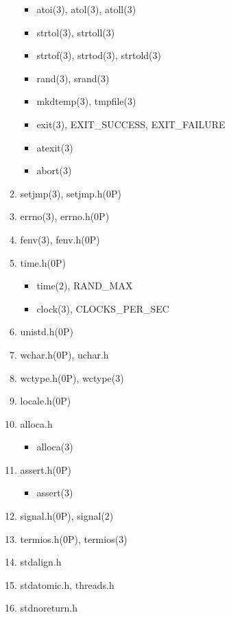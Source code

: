 \documentclass{article}
\begin{document}
\begin{enumerate}
\begin{enumerate}
\begin{itemize}
                    \item atoi(3), atol(3), atoll(3)
                    \item strtol(3), strtoll(3)
                    \item strtof(3), strtod(3), strtold(3)
                    \item rand(3), srand(3)
                    \item mkdtemp(3), tmpfile(3)
                    \item exit(3), EXIT_SUCCESS, EXIT_FAILURE
                    \item atexit(3)
                    \item abort(3)
                \end{itemize}
            \item setjmp(3), setjmp.h(0P)
            \item errno(3), errno.h(0P)
            \item fenv(3), fenv.h(0P)
            \item time.h(0P)
                \begin{itemize}
                    \item time(2), RAND_MAX
                    \item clock(3), CLOCKS_PER_SEC
                \end{itemize}
            \item unistd.h(0P)
            \item wchar.h(0P), uchar.h
            \item wctype.h(0P), wctype(3)
            \item locale.h(0P)
            \item alloca.h
                \begin{itemize}
                    \item alloca(3)
                \end{itemize}
            \item assert.h(0P)
                \begin{itemize}
                    \item assert(3)
                \end{itemize}
            \item signal.h(0P), signal(2)
            \item termios.h(0P), termios(3)
            \item stdalign.h
            \item stdatomic.h, threads.h
            \item stdnoreturn.h

\end{enumerate}
\end{enumerate}
\end{document}
